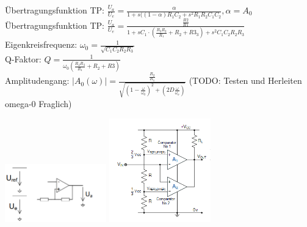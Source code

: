 \documentclass[A4]{scrartcl}
\begin{document}
  Übertragungsfunktion TP: $\frac{U_a}{U_e} = \frac{\alpha}{1+s((1-\alpha)R_1C_2+s^2R_1R_2C_1C_2}, \alpha = A_0$\\
  
  Übertragungsfunktion TP: $\frac{U_a}{U_e} = \frac{\frac{R2}{R1}}{1+sC_1\cdot (\frac{R_3 R_2}{R_1} + R_2 + R3_3) + s^2C_1C_2R_2R_3 }$\\
  Eigenkreisfrequenz: $\omega_0 = \frac{1}{\sqrt{C_1C_2R_2R_3}}$\\
  Q-Faktor: $Q = \frac{1}{\omega_0 (\frac{R_2R_3}{R_1}+R_2+R3)}$\\
  Amplitudengang: $|A_0(\omega)| = \frac{\frac{R_2}{R_1}}{\sqrt{(1-\frac{\omega}{\omega_0})^2+(2D\frac{\omega}{\omega_o})}}$ (TODO: Testen und Herleiten omega-0 Fraglich)

  \includegraphics[width=0.33\textwidth]{Komparator.png}
  \includegraphics[width=0.33\textwidth]{Fensterkomparator.png}
  
\end{document}
